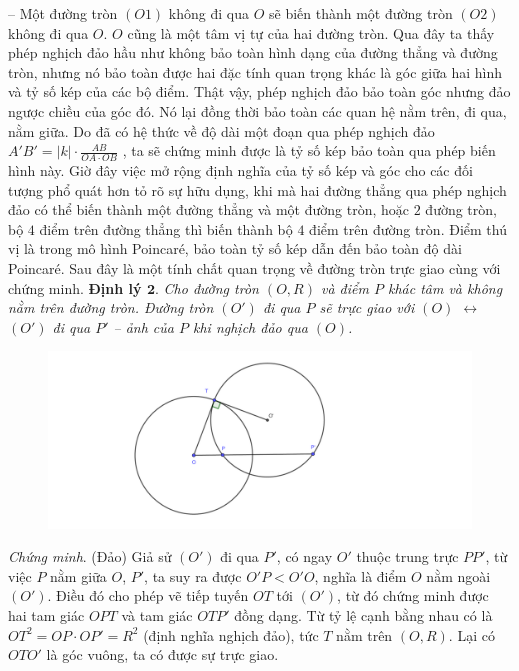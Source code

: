 \begin{multicols}{2}
	\vskip 0.1cm 
	-- Một đường tròn $(O1)$ không đi qua $O$ sẽ biến thành một đường tròn $(O2)$ không đi qua $O$. $O$ cũng là một tâm vị tự của hai đường tròn. 
	\vskip 0.1cm
	Qua đây ta thấy phép nghịch đảo hầu như không bảo toàn hình dạng của đường thẳng và đường tròn, nhưng nó bảo toàn được hai đặc tính quan trọng khác là góc giữa hai hình và tỷ số kép của các bộ điểm. Thật vậy, phép nghịch đảo bảo toàn góc nhưng đảo ngược chiều của góc đó. Nó lại đồng thời bảo toàn các quan hệ nằm trên, đi qua, nằm giữa. Do đã có hệ thức về độ dài một đoạn qua phép nghịch đảo  $A'B' = |k|\cdot \frac{AB}{OA\cdot OB}$ , ta sẽ chứng minh được là tỷ số kép bảo toàn qua phép biến hình này. Giờ đây việc mở rộng định nghĩa của tỷ số kép và góc cho các đối tượng phổ quát hơn tỏ rõ sự hữu dụng, khi mà hai đường thẳng qua phép nghịch đảo có thể biến thành một đường thẳng và một đường tròn, hoặc $2$ đường tròn, bộ $4$ điểm trên đường thẳng thì biến thành bộ $4$ điểm trên đường tròn. Điểm thú vị là trong mô hình Poincar\'e, bảo toàn tỷ số kép dẫn đến bảo toàn độ dài Poincar\'e.
	\vskip 0.1cm
	Sau đây là một tính chất quan trọng về đường tròn trực giao cùng với chứng minh.
	\vskip 0.1cm
	\textbf{\color{lichsutoanhoc}Định lý $\pmb{2.}$} \textit{ Cho đường tròn $(O, R)$ và điểm $P$ khác tâm và không nằm trên đường tròn. Đường tròn $(O')$ đi qua $P$ sẽ trực giao với $(O)$ $ \leftrightarrow$ $(O')$ đi qua $P'$ -- ảnh của $P$ khi nghịch đảo qua $(O)$.}
	\begin{figure}[H]
		\vspace*{-10pt}
		\centering
		\captionsetup{labelformat= empty, justification=centering}
		\includegraphics[width= 1\linewidth]{Dinh_ly_1.pdf}
		\vspace*{-20pt}
	\end{figure}
	\textit{Chứng minh}. (Đảo) Giả sử $(O')$ đi qua $P'$, có ngay $O'$ thuộc trung trực $PP'$, từ việc $P$ nằm giữa $O$, $P'$, ta suy ra được $O'P<O'O$, nghĩa là điểm $O$ nằm ngoài $(O')$. Điều đó cho phép vẽ tiếp tuyến $OT$ tới $(O')$, từ đó chứng minh được hai tam giác $OPT$ và tam giác $OTP'$ đồng dạng. Từ tỷ lệ cạnh bằng nhau có là $OT^2 = OP\cdot OP' = R^2$ (định nghĩa nghịch đảo), tức $T$ nằm trên $(O, R)$. Lại có $OTO'$ là góc vuông, ta có được sự trực giao.

\end{multicols}
